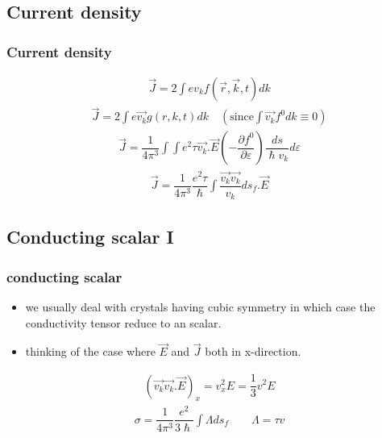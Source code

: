 \documentclass{beamer}
\begin{document}
\subsection{Current density}
\begin{frame}
\frametitle{Current density}
\pause
\begin{align*}
\vec{J} = 2 \int e v_k f (\vec{r},\vec{k},t) dk
\end{align*}
\pause
\begin{align*}
\vec{J} = 2 \int e \vec{v_k} g (r,k,t) dk \quad (\text{since} \int \vec{v_k} f^0 dk \equiv 0) 
\end{align*}
\pause
\begin{align*}
\vec{J} = \dfrac{1}{4 \pi ^3} \int \int e^2 \tau \vec{v_k}.\vec{E} (- \dfrac{\partial f^0}{\partial \varepsilon}) \dfrac{ds}{\hslash v_k}d\varepsilon 
\end{align*}
\pause
\begin{align*}
\vec{J} = \dfrac{1}{4 \pi ^3} \dfrac{e^2 \tau}{\hslash} \int \dfrac{\vec{v_k}\vec{v_k}}{v_k}ds_f .\vec{E}
\end{align*}
\end{frame}
\subsection{Conducting scalar I}
\begin{frame}
\frametitle{conducting scalar}
\begin{itemize}
\item we usually deal with crystals having cubic symmetry in which case the conductivity tensor reduce to  an scalar.
\pause
\item thinking of the case where $\vec{E}$ and $\vec{J}$ both in x-direction.
\end{itemize}
\pause
\begin{align*}
(\vec{v_k}\vec{v_k}.\vec{E})_x = v_x^2 E = \dfrac{1}{3} v^2 E
\end{align*}
\pause
\begin{align*}
\sigma = \dfrac{1}{4 \pi ^3} \dfrac{e^2}{3 \hslash} \int \Lambda ds_f  \qquad \Lambda = \tau v
\end{align*}
\end{frame}
\end{document}

